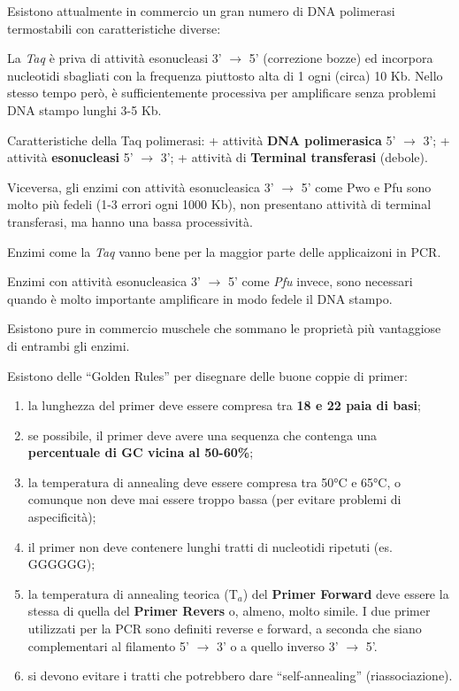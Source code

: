 \documentclass[11pt]{book}
\begin{document}
Esistono attualmente in commercio un gran numero di DNA polimerasi
termostabili con caratteristiche diverse:

La \emph{Taq} è priva di attività esonucleasi 3' \(\rightarrow\) 5'
(correzione bozze) ed incorpora nucleotidi sbagliati con la frequenza
piuttosto alta di 1 ogni (circa) 10 Kb. Nello stesso tempo però, è
sufficientemente processiva per amplificare senza problemi DNA stampo
lunghi 3-5 Kb.

Caratteristiche della Taq polimerasi: + attività \textbf{DNA
polimerasica} 5' \(\rightarrow\) 3'; + attività \textbf{esonucleasi} 5'
\(\rightarrow\) 3'; + attività di \textbf{Terminal transferasi}
(debole).

Viceversa, gli enzimi con attività esonucleasica 3' \(\rightarrow\) 5'
come Pwo e Pfu sono molto più fedeli (1-3 errori ogni 1000 Kb), non
presentano attività di terminal transferasi, ma hanno una bassa
processività.

Enzimi come la \emph{Taq} vanno bene per la maggior parte delle
applicaizoni in PCR.

Enzimi con attività esonucleasica 3' \(\rightarrow\) 5' come \emph{Pfu}
invece, sono necessari quando è molto importante amplificare in modo
fedele il DNA stampo.

Esistono pure in commercio muschele che sommano le proprietà più
vantaggiose di entrambi gli enzimi.

Esistono delle ``Golden Rules'' per disegnare delle buone coppie di
primer:

\begin{enumerate}
\def\labelenumi{\arabic{enumi}.}
\itemsep1pt\parskip0pt
\item
  la lunghezza del primer deve essere compresa tra \textbf{18 e 22 paia
  di basi};
\item
  se possibile, il primer deve avere una sequenza che contenga una
  \textbf{percentuale di GC vicina al 50-60\%};
\item
  la temperatura di annealing deve essere compresa tra 50°C e 65°C, o
  comunque non deve mai essere troppo bassa (per evitare problemi di
  aspecificità);
\item
  il primer non deve contenere lunghi tratti di nucleotidi ripetuti (es.
  GGGGGG);
\item
  la temperatura di annealing teorica (T\(_a\)) del \textbf{Primer
  Forward} deve essere la stessa di quella del \textbf{Primer Revers} o,
  almeno, molto simile. I due primer utilizzati per la PCR sono definiti
  reverse e forward, a seconda che siano complementari al filamento 5'
  \(\rightarrow\) 3' o a quello inverso 3' \(\rightarrow\) 5'.
\item
  si devono evitare i tratti che potrebbero dare ``self-annealing''
  (riassociazione).
\end{enumerate}
\end{document}
